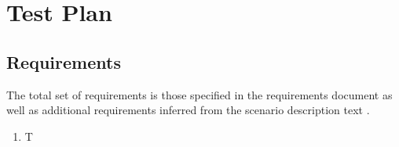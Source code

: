 %
%
%


\section{Test Plan}
%
%


%
%

\subsection{Requirements}
The total set of requirements is those specified in the requirements document
\cite{2dv610:assignment2-requirements} as well as additional requirements
inferred from the scenario description text
\cite{2dv610:assignment2-instructions}.

\begin{enumerate}
\item T
\end{enumerate}

